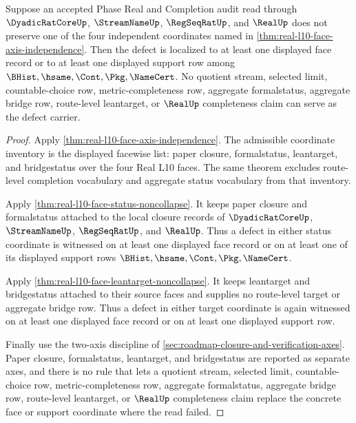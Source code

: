\begin{theorem}
\label{thm:real-l10-face-axis-defect-localization}
Suppose an accepted Phase Real and Completion audit read through
$\DyadicRatCoreUp$, $\StreamNameUp$, $\RegSeqRatUp$, and $\RealUp$ does not
preserve one of the four independent coordinates named in
\autoref{thm:real-l10-face-axis-independence}. Then the defect is localized to
at least one displayed face record or to at least one displayed support row
among $\BHist,\hsame,\Cont,\Pkg,\NameCert$. No quotient stream, selected
limit, countable-choice row, metric-completeness row, aggregate formalstatus,
aggregate bridge row, route-level leantarget, or $\RealUp$ completeness claim
can serve as the defect carrier.
\end{theorem}
\begin{proof}
Apply \autoref{thm:real-l10-face-axis-independence}. The admissible coordinate
inventory is the displayed facewise list: paper closure, formalstatus,
leantarget, and bridgestatus over the four Real L10 faces. The same theorem
excludes route-level completion vocabulary and aggregate status vocabulary from
that inventory.

Apply \autoref{thm:real-l10-face-status-noncollapse}. It keeps paper closure
and formalstatus attached to the local closure records of
$\DyadicRatCoreUp$, $\StreamNameUp$, $\RegSeqRatUp$, and $\RealUp$. Thus a
defect in either status coordinate is witnessed on at least one displayed face
record or on at least one of its displayed support rows
$\BHist,\hsame,\Cont,\Pkg,\NameCert$.

Apply \autoref{thm:real-l10-face-leantarget-noncollapse}. It keeps leantarget
and bridgestatus attached to their source faces and supplies no route-level
target or aggregate bridge row. Thus a defect in either target coordinate is
again witnessed on at least one displayed face record or on at least one
displayed support row.

Finally use the two-axis discipline of
\autoref{sec:roadmap-closure-and-verification-axes}. Paper closure,
formalstatus, leantarget, and bridgestatus are reported as separate axes, and
there is no rule that lets a quotient stream, selected limit,
countable-choice row, metric-completeness row, aggregate formalstatus,
aggregate bridge row, route-level leantarget, or $\RealUp$ completeness claim
replace the concrete face or support coordinate where the read failed.
\end{proof}

